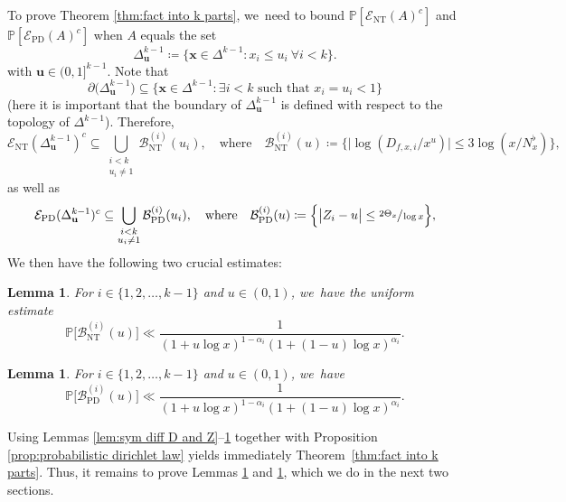 \documentclass[JEP,XML,SOM,Unicode,published]{cedram}
\newcommand{\bu}{{\boldsymbol u}}
\newcommand{\bx}{{\boldsymbol x}}
\newcommand{\PP}{\mathbb{P}}
\newcommand{\EC}{\mathcal{E}}
\newcommand{\simplex}{\Delta^{k-1}}
\newcommand{\bg}{\big}
\newcommand{\bgg}{\Big}
\newcommand{\ECnt}{\EC_{\mathrm{NT}}}
\newcommand{\ECprob}{\EC_{\mathrm{PD}}}
\newcommand{\Bnt}{\mathcal{B}_{\mathrm{NT}}}
\newcommand{\Bprob}{\mathcal{B}_{\mathrm{PD}}}
\theoremstyle{plain}
\newtheorem{lem}[cor]{Lemma}
\theoremstyle{definition}
\begin{document}
To prove Theorem \ref{thm:fact into k parts}, we~need to bound $\PP[\ECnt(A)^c]$ and $\PP[\ECprob(A)^c]$ when $A$ equals the set
\[
\simplex_{\mathbf{u}} \coloneqq \{\bx\in \simplex: x_i\le u_i\ \forall i<k\}.
\]
with $\bu\in(0,1]^{k-1}$. Note that
\[
\partial \bg(\simplex_{\mathbf{u}}\bg) \subseteq \{\bx \in \simplex : \exists i < k \text{ such that } x_i = u_i < 1\}
\]
(here it is important that the boundary of $\simplex_{\mathbf{u}}$ is defined with respect to the topology of $\simplex$). Therefore,
\[
\ECnt(\simplex_{\mathbf{u}})^c\subseteq\! \bigcup_{\substack{i<k \\ u_i\neq 1}} \Bnt^{(i)}(u_i),
\quad\text{where}\quad
\Bnt^{(i)}(u) \coloneqq \bgg\{ \bg| \log(D_{f,x,i}/x^u)\bg|\le 3\log(x/N_x^\flat) \bgg\},
\]
as well as
\[
\ECprob(\simplex_{\mathbf{u}})^c\subseteq \bigcup_{\substack{i< k \\ u_i\neq 1}} \Bprob^{(i)}(u_i),
\quad\text{where}\quad
\Bprob^{(i)}(u) \coloneqq \bgg\{ \bg| Z_i - u \bg|\le \sfrac{2\Theta_x}{\log x} \bgg\},
\]
We then have the following two crucial estimates:

\begin{lem}
\label{lem:bound of prob of ECnt}
For $i\in\{1,2,\dots,k-1\}$ and $u\in(0,1)$, we~have the uniform estimate
\[
\PP\bg[\Bnt^{(i)}(u) \bg] \ll \frac{1}{(1+ u\log x)^{1-\alpha_i}(1+(1-u)\log x)^{\alpha_i}}.
\]
\end{lem}

\begin{lem}
\label{lem:bound of prob of ECprob}
For $i\in\{1,2,\dots,k-1\}$ and $u\in(0,1)$, we~have
\[
\PP\bg[\Bprob^{(i)}(u) \bg] \ll \frac{1}{(1+ u\log x)^{1-\alpha_i}(1+(1-u)\log x)^{\alpha_i}}.
\]
\end{lem}

Using Lemmas \ref{lem:sym diff D and Z}--\ref{lem:bound of prob of ECprob} together with Proposition \ref{prop:probabilistic dirichlet law} yields immediately Theorem~\ref{thm:fact into k parts}. Thus, it remains to prove Lemmas \ref{lem:bound of prob of ECnt} and \ref{lem:bound of prob of ECprob}, which we do in the next two sections.
\end{document}
